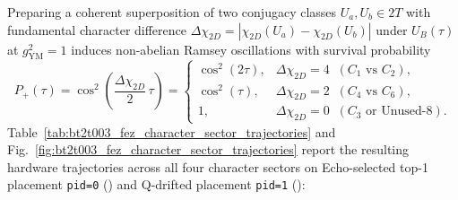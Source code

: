 \documentclass[aps,prx,twocolumn,superscriptaddress,nofootinbib]{revtex4-2}
\begin{document}
Preparing a coherent superposition of two conjugacy classes $U_a, U_b \in 2T$ with fundamental character difference $\Delta\chi_{2D} = |\chi_{2D}(U_a) - \chi_{2D}(U_b)|$ under $U_B(\tau)$ at $g_{\mathrm{YM}}^2 = 1$ induces non-abelian Ramsey oscillations with survival probability
\begin{equation}
\label{eq:character_ramsey_frequency}
P_{+}(\tau) = \cos^2\!\left(\frac{\Delta\chi_{2D}}{2}\,\tau\right) = \begin{cases} \cos^2(2\tau), & \Delta\chi_{2D} = 4 \;\; (C_1 \text{ vs } C_2), \\ \cos^2(\tau), & \Delta\chi_{2D} = 2 \;\; (C_4 \text{ vs } C_6), \\ 1, & \Delta\chi_{2D} = 0 \;\; (C_3 \text{ or Unused-}8). \end{cases}
\end{equation}
Table~\ref{tab:bt2t003_fez_character_sector_trajectories} and Fig.~\ref{fig:bt2t003_fez_character_sector_trajectories} report the resulting hardware trajectories across all four character sectors on Echo-selected top-1 placement \texttt{pid=0} (\BTPlaqPidZeroQubits) and Q\BTPlaqDriftedHubQubit-drifted placement \texttt{pid=1} (\BTPlaqPidOneQubits):
\end{document}

